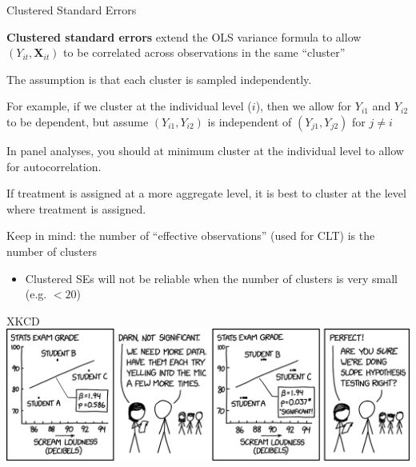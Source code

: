 \documentclass[11pt,english,handout]{beamer}
\newenvironment{wideitemize}{\itemize\addtolength{\itemsep}{10pt}}{\enditemize}
\begin{document}
\begin{frame}{Clustered Standard Errors}
	\begin{wideitemize}
		\item 
		\textbf{Clustered standard errors} extend the OLS variance formula to allow $(Y_{it}, \bm{X}_{it})$ to be correlated across observations in the same ``cluster''
		
		\pause
		\item
		The assumption is that each cluster is sampled independently.
		
		\pause
		\item
		For example, if we cluster at the individual level ($i$), then we allow for $Y_{i1}$ and $Y_{i2}$ to be dependent, but assume $(Y_{i1},Y_{i2})$ is independent of $(Y_{j1},Y_{j2})$ for $j\neq i$
		
		\pause
		\item
		In panel analyses, you should at minimum cluster at the individual level to allow for autocorrelation. \pause
		
		\item
		If treatment is assigned at a more aggregate level, it is best to cluster at the level where treatment is assigned.
		
		\pause
		\item
		Keep in mind: the number of ``effective observations'' (used for CLT) is the number of clusters
			\begin{itemize}
				\item 
				Clustered SEs will not be reliable when the number of clusters is very small (e.g. $<20$)
			\end{itemize}	
	\end{wideitemize}
\end{frame}

\begin{frame}{XKCD}
	\centering
	\includegraphics[width=0.9\linewidth]{xkcd}
\end{frame}
\end{document}

